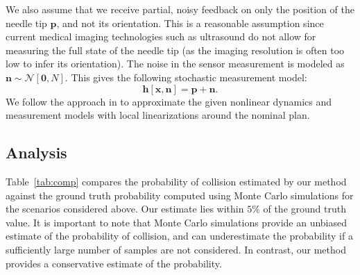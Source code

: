 We also assume that we receive partial, noisy feedback on only the position of the needle tip $\mathbf{p}$, and not its orientation. This is a reasonable assumption since current medical imaging
technologies such as ultrasound do not allow for measuring the full state of the needle tip (as the imaging resolution is often too low to infer its orientation). The noise in the
sensor measurement is modeled as $\mathbf{n} \sim \mathcal{N}[\mathbf{0}, N]$. This gives the following stochastic measurement model:
\begin{equation}
\mathbf{h}[\mathbf{x}, \mathbf{n}] = \mathbf{p} + \mathbf{n}.
\end{equation}
We follow the approach in \cite{vandenBerg10_WAFR} to approximate the given nonlinear dynamics and measurement models with local linearizations around the nominal plan.


\subsection{Analysis}


Table~\ref{tab:comp} compares the probability of collision estimated by our method against the ground truth probability computed using Monte Carlo simulations for the scenarios considered above. Our estimate lies within $5\%$ of the ground truth value. It is important to note that Monte Carlo simulations provide an unbiased estimate of the probability of collision, and can underestimate the probability if a sufficiently large number of samples are not considered. In contrast, our method provides a conservative estimate of the probability.


